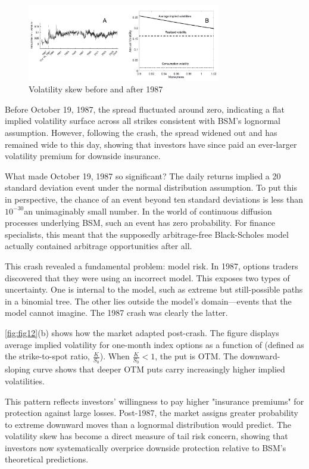 \begin{figure}[h]
    \centering
    \includegraphics[width=0.75\textwidth]{fig12.png}
    \caption{Volatility skew before and after 1987 \citep{benzoni2011explaining, seo2019option}}
    \label{fig:fig12}
\end{figure}

Before October 19, 1987, the spread fluctuated around zero, indicating a flat implied volatility surface across all strikes consistent with BSM’s lognormal assumption. However, following the crash, the spread widened out and has remained wide to this day, showing that investors have since paid an ever-larger volatility premium for downside insurance.

What made October 19, 1987 so significant? The daily returns implied a 20 standard deviation event under the normal distribution assumption. To put this in perspective, the chance of an event beyond ten standard deviations is less than ${10}^{-30}$\textemdash an unimaginably small number. In the world of continuous diffusion processes underlying BSM, such an event has zero probability. For finance specialists, this meant that the supposedly arbitrage-free Black-Scholes model actually contained arbitrage opportunities after all.

This crash revealed a fundamental problem: model risk. In 1987, options traders discovered that they were using an incorrect model. This exposes two types of uncertainty. One is internal to the model, such as extreme but still-possible paths in a binomial tree. The other lies outside the model’s domain—events that the model cannot imagine. The 1987 crash was clearly the latter.

\autoref{fig:fig12}(b) \citep{seo2019option} shows how the market adapted post-crash. The figure displays average implied volatility for one-month index options as a function of  (defined as the strike-to-spot ratio, $\frac{K}{S_0}$). When $\frac{K}{S_0} < 1$, the put is OTM. The downward-sloping curve shows that deeper OTM puts carry increasingly higher implied volatilities. 

This pattern reflects investors' willingness to pay higher "insurance premiums" for protection against large losses. Post-1987, the market assigns greater probability to extreme downward moves than a lognormal distribution would predict. The volatility skew has become a direct measure of tail risk concern, showing that investors now systematically overprice downside protection relative to BSM's theoretical predictions.

